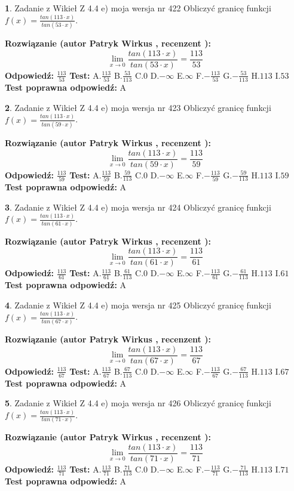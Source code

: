 \documentclass[12pt, a4paper]{article}
\theoremstyle{definition} %
\newtheorem{zad}{}
\newcommand{\zadStart}[1]{\begin{zad}#1\newline}
\newcommand{\zadStop}{\end{zad}}
\newcommand{\rozwStart}[2]{\noindent \textbf{Rozwiązanie (autor #1 , recenzent #2): }\newline}
\newcommand{\rozwStop}{\newline}
\newcommand{\odpStart}{\noindent \textbf{Odpowiedź:}\newline}
\newcommand{\odpStop}{\newline}
\newcommand{\testStart}{\noindent \textbf{Test:}\newline}
\newcommand{\testStop}{\newline}
\newcommand{\kluczStart}{\noindent \textbf{Test poprawna odpowiedź:}\newline}
\newcommand{\kluczStop}{\newline}
\begin{document}
\zadStart{Zadanie z Wikieł Z 4.4 e) moja wersja nr 422}
Obliczyć granicę funkcji $f(x)=\frac{tan(113\cdot x)}{tan(53\cdot x)}$.
\zadStop
\rozwStart{Patryk Wirkus}{}
$$\lim\limits_{x\to 0}\frac{tan(113\cdot x)}{tan(53\cdot x)}=
\frac{113}{53}$$
\rozwStop
\odpStart
$\frac{113}{53}$
\odpStop
\testStart
A.$\frac{113}{53}$
B.$\frac{53}{113}$
C.$0$
D.$-\infty$
E.$\infty$
F.$-\frac{113}{53}$
G.$-\frac{53}{113}$
H.$113$
I.$53$
\testStop
\kluczStart
A
\kluczStop



\zadStart{Zadanie z Wikieł Z 4.4 e) moja wersja nr 423}
Obliczyć granicę funkcji $f(x)=\frac{tan(113\cdot x)}{tan(59\cdot x)}$.
\zadStop
\rozwStart{Patryk Wirkus}{}
$$\lim\limits_{x\to 0}\frac{tan(113\cdot x)}{tan(59\cdot x)}=
\frac{113}{59}$$
\rozwStop
\odpStart
$\frac{113}{59}$
\odpStop
\testStart
A.$\frac{113}{59}$
B.$\frac{59}{113}$
C.$0$
D.$-\infty$
E.$\infty$
F.$-\frac{113}{59}$
G.$-\frac{59}{113}$
H.$113$
I.$59$
\testStop
\kluczStart
A
\kluczStop



\zadStart{Zadanie z Wikieł Z 4.4 e) moja wersja nr 424}
Obliczyć granicę funkcji $f(x)=\frac{tan(113\cdot x)}{tan(61\cdot x)}$.
\zadStop
\rozwStart{Patryk Wirkus}{}
$$\lim\limits_{x\to 0}\frac{tan(113\cdot x)}{tan(61\cdot x)}=
\frac{113}{61}$$
\rozwStop
\odpStart
$\frac{113}{61}$
\odpStop
\testStart
A.$\frac{113}{61}$
B.$\frac{61}{113}$
C.$0$
D.$-\infty$
E.$\infty$
F.$-\frac{113}{61}$
G.$-\frac{61}{113}$
H.$113$
I.$61$
\testStop
\kluczStart
A
\kluczStop



\zadStart{Zadanie z Wikieł Z 4.4 e) moja wersja nr 425}
Obliczyć granicę funkcji $f(x)=\frac{tan(113\cdot x)}{tan(67\cdot x)}$.
\zadStop
\rozwStart{Patryk Wirkus}{}
$$\lim\limits_{x\to 0}\frac{tan(113\cdot x)}{tan(67\cdot x)}=
\frac{113}{67}$$
\rozwStop
\odpStart
$\frac{113}{67}$
\odpStop
\testStart
A.$\frac{113}{67}$
B.$\frac{67}{113}$
C.$0$
D.$-\infty$
E.$\infty$
F.$-\frac{113}{67}$
G.$-\frac{67}{113}$
H.$113$
I.$67$
\testStop
\kluczStart
A
\kluczStop



\zadStart{Zadanie z Wikieł Z 4.4 e) moja wersja nr 426}
Obliczyć granicę funkcji $f(x)=\frac{tan(113\cdot x)}{tan(71\cdot x)}$.
\zadStop
\rozwStart{Patryk Wirkus}{}
$$\lim\limits_{x\to 0}\frac{tan(113\cdot x)}{tan(71\cdot x)}=
\frac{113}{71}$$
\rozwStop
\odpStart
$\frac{113}{71}$
\odpStop
\testStart
A.$\frac{113}{71}$
B.$\frac{71}{113}$
C.$0$
D.$-\infty$
E.$\infty$
F.$-\frac{113}{71}$
G.$-\frac{71}{113}$
H.$113$
I.$71$
\testStop
\kluczStart
A
\kluczStop
\end{document}
